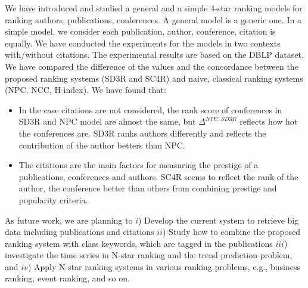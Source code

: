 \documentclass[10pt,leqno,twoside]{article}
\begin{document}
We have introduced and studied a general and a simple 4-star ranking models for ranking authors, publications, conferences. A general model is a generic one. In a simple model, we consider each publication, author, conference, citation is equally. We have conducted the experiments for the models in two contexts with/without citations. The experimental results are based on the DBLP dataset. We have compared the difference of the values and the concordance between the proposed ranking systems (SD3R and SC4R) and naive, classical ranking systems (NPC, NCC, H-index). We have found that:
\begin{itemize}
\item In the case citations are not considered, the rank score of conferences in SD3R and NPC model are almost the same, but $\Delta^{NPC,SD3R}$ reflects how hot the conferences are. SD3R ranks authors differently and reflects the contribution of the author betters than NPC.
\item The citations are the main factors for measuring the prestige of a publications, conferences and authors. SC4R seems to reflect the rank of the author, the conference better than others from combining prestige and popularity criteria.
\end{itemize}

As future work, we are planning to $i$) Develop the current system to retrieve big data including publications and  citations  $ii$) Study how to combine the proposed ranking system with class keywords, which are tagged in the publications $iii$) investigate the time series in N-star ranking and the trend prediction problem, and $iv$) Apply N-star ranking systems in various ranking problems, e.g., business ranking, event ranking, and so on.
\end{document}
